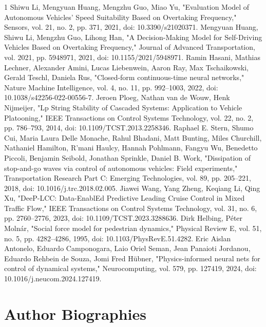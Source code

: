 \documentclass[journal]{IEEEtran}
\begin{document}
\begin{thebibliography}{1}
 Shiwu Li, Mengyuan Huang, Mengzhu Guo, Miao Yu, "Evaluation Model of Autonomous Vehicles' Speed Suitability Based on Overtaking Frequency," Sensors, vol. 21, no. 2, pp. 371, 2021, doi: 10.3390/s21020371.
 Mengyuan Huang, Shiwu Li, Mengzhu Guo, Lihong Han, "A Decision-Making Model for Self-Driving Vehicles Based on Overtaking Frequency," Journal of Advanced Transportation, vol. 2021, pp. 5948971, 2021, doi: 10.1155/2021/5948971.
 Ramin Hasani, Mathias Lechner, Alexander Amini, Lucas Liebenwein, Aaron Ray, Max Tschaikowski, Gerald Teschl, Daniela Rus, "Closed-form continuous-time neural networks," Nature Machine Intelligence, vol. 4, no. 11, pp. 992--1003, 2022, doi: 10.1038/s42256-022-00556-7.
 Jeroen Ploeg, Nathan van de Wouw, Henk Nijmeijer, "Lp String Stability of Cascaded Systems: Application to Vehicle Platooning," IEEE Transactions on Control Systems Technology, vol. 22, no. 2, pp. 786--793, 2014, doi: 10.1109/TCST.2013.2258346.
 Raphael E. Stern, Shumo Cui, Maria Laura Delle Monache, Rahul Bhadani, Matt Bunting, Miles Churchill, Nathaniel Hamilton, R'mani Haulcy, Hannah Pohlmann, Fangyu Wu, Benedetto Piccoli, Benjamin Seibold, Jonathan Sprinkle, Daniel B. Work, "Dissipation of stop-and-go waves via control of autonomous vehicles: Field experiments," Transportation Research Part C: Emerging Technologies, vol. 89, pp. 205--221, 2018, doi: 10.1016/j.trc.2018.02.005.
 Jiawei Wang, Yang Zheng, Keqiang Li, Qing Xu, "DeeP-LCC: Data-EnablEd Predictive Leading Cruise Control in Mixed Traffic Flow," IEEE Transactions on Control Systems Technology, vol. 31, no. 6, pp. 2760--2776, 2023, doi: 10.1109/TCST.2023.3288636.
 Dirk Helbing, Péter Molnár, "Social force model for pedestrian dynamics," Physical Review E, vol. 51, no. 5, pp. 4282--4286, 1995, doi: 10.1103/PhysRevE.51.4282.
 Eric Aislan Antonelo, Eduardo Camponogara, Laio Oriel Seman, Jean Panaioti Jordanou, Eduardo Rehbein de Souza, Jomi Fred Hübner, "Physics-informed neural nets for control of dynamical systems," Neurocomputing, vol. 579, pp. 127419, 2024, doi: 10.1016/j.neucom.2024.127419.
\end{thebibliography}

\clearpage
\clearpage
\section*{Author Biographies}
\end{document}
